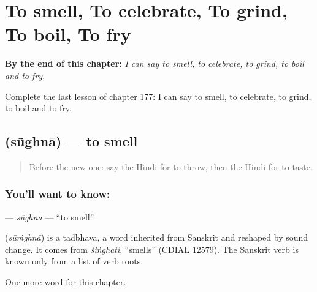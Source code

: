 
\chapter{To smell, To celebrate, To grind, To boil, To fry}
\label{ch:hi-to-smell-to-celebrate-to-grind-to-boil-to-fry}

\begin{chapteropening}
\textbf{By the end of this chapter:} \emph{I can say to smell, to celebrate, to grind, to boil and to fry.}

Complete the last lesson of chapter 177: I can say to smell, to celebrate, to grind, to boil and to fry.
\end{chapteropening}

\section[\texorpdfstring{\hi{सूँघना} (sū̃ghnā)}{सूँघना (sū̃ghnā)}]{ (sū̃ghnā) — to smell}

\label{lesson:HI-C177-sughna}



\begin{quote}
Before the new one: say the Hindi for to throw, then the Hindi for to taste.
\end{quote}

\subsection*{You'll want to know: }
\textbf{} — \emph{sū̃ghnā} — \textquotedblleft{}to smell\textquotedblright{}.

\begin{cousinweb}
\textbf{} (\emph{sūṁghnā}) is a tadbhava, a word inherited from Sanskrit and reshaped by sound change. It comes from \emph{śiṅghati}, \textquotedblleft{}smells\textquotedblright{} (CDIAL 12579). The Sanskrit verb is known only from a list of verb roots.
\end{cousinweb}

\begin{grammarlens}[title={What you've built}]
One more word for this chapter.
\end{grammarlens}

